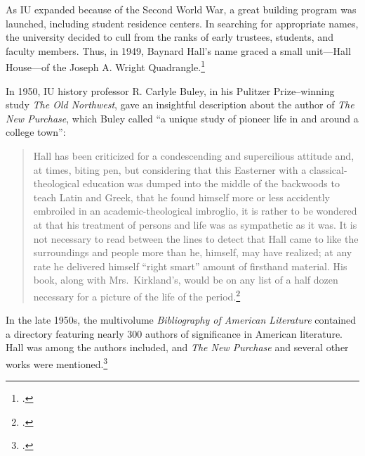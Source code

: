 \documentclass[
  american,
  letterpaper,
]{scrreprt}
\begin{document}
As IU expanded because of the Second World War, a great building program
was launched, including student residence centers. In searching for
appropriate names, the university decided to cull from the ranks of
early trustees, students, and faculty members. Thus, in 1949, Baynard
Hall's name graced a small unit---Hall House---of the Joseph A. Wright
Quadrangle.\footnote{.}

In 1950, IU history professor R. Carlyle Buley, in his Pulitzer
Prize--winning study \emph{The Old Northwest}, gave an insightful
description about the author of \emph{The New Purchase}, which Buley
called ``a unique study of pioneer life in and around a college town'':

\begin{quote}
Hall has been criticized for a condescending and supercilious attitude
and, at times, biting pen, but considering that this Easterner with a
classical-theological education was dumped into the middle of the
backwoods to teach Latin and Greek, that he found himself more or less
accidently embroiled in an academic-theological imbroglio, it is rather
to be wondered at that his treatment of persons and life was as
sympathetic as it was. It is not necessary to read between the lines to
detect that Hall came to like the surroundings and people more than he,
himself, may have realized; at any rate he delivered himself ``right
smart'' amount of firsthand material. His book, along with
Mrs.~Kirkland's, would be on any list of a half dozen necessary for a
picture of the life of the period.\footnote{.}
\end{quote}

In the late 1950s, the multivolume \emph{Bibliography of American
Literature} contained a directory featuring nearly 300 authors of
significance in American literature. Hall was among the authors
included, and \emph{The New Purchase} and several other works were
mentioned.\footnote{.}
\end{document}
